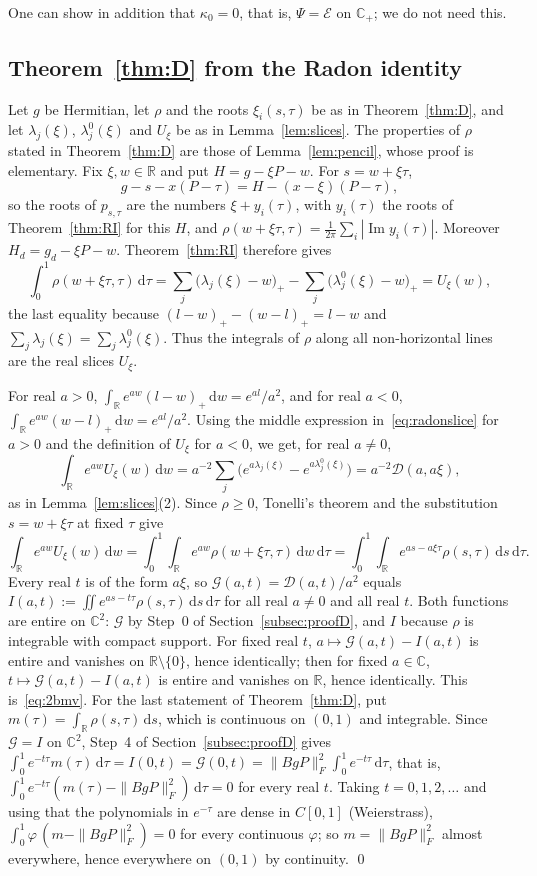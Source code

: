 \documentclass[11pt]{amsart}
\theoremstyle{definition}
\theoremstyle{remark}
\numberwithin{equation}{section}
\newcommand{\R}{\mathbb{R}}
\newcommand{\C}{\mathbb{C}}
\renewcommand{\Im}{\operatorname{Im}}
\newcommand{\cD}{\mathcal{D}}
\newcommand{\cG}{\mathcal{G}}
\newcommand{\dd}{\,\mathrm{d}}
\begin{document}
One can show in addition that $\kappa_0=0$, that is, $\Psi=\mathcal E$ on $\C_+$; we do not need this.

\subsection{Theorem~\ref{thm:D} from the Radon identity}\label{subsec:RItoD}
Let $g$ be Hermitian, let $\rho$ and the roots $\xi_i(s,\tau)$ be as in Theorem~\ref{thm:D}, and let $\lambda_j(\xi)$,
$\lambda^0_j(\xi)$ and $U_\xi$ be as in Lemma~\ref{lem:slices}. The properties of $\rho$ stated in Theorem~\ref{thm:D} are those
of Lemma~\ref{lem:pencil}, whose proof is elementary. Fix $\xi,w\in\R$ and put $H=g-\xi P-w$. For $s=w+\xi\tau$,
\[
g-s-x(P-\tau)=H-(x-\xi)(P-\tau),
\]
so the roots of $p_{s,\tau}$ are the numbers $\xi+y_i(\tau)$, with $y_i(\tau)$ the roots of Theorem~\ref{thm:RI} for this $H$,
and $\rho(w+\xi\tau,\tau)=\frac1{2\pi}\sum_i|\Im y_i(\tau)|$. Moreover $H_d=g_d-\xi P-w$. Theorem~\ref{thm:RI} therefore gives
\begin{equation}\label{eq:radonslice}
\int_0^1\rho(w+\xi\tau,\tau)\dd\tau=\sum_j\bigl(\lambda_j(\xi)-w\bigr)_+-\sum_j\bigl(\lambda^0_j(\xi)-w\bigr)_+=U_\xi(w),
\end{equation}
the last equality because $(l-w)_+-(w-l)_+=l-w$ and $\sum_j\lambda_j(\xi)=\sum_j\lambda^0_j(\xi)$. Thus the integrals of $\rho$
along all non-horizontal lines are the real slices $U_\xi$.

For real $a>0$, $\int_\R e^{aw}(l-w)_+\dd w=e^{al}/a^2$, and for real $a<0$, $\int_\R e^{aw}(w-l)_+\dd w=e^{al}/a^2$. Using the
middle expression in~\eqref{eq:radonslice} for $a>0$ and the definition of $U_\xi$ for $a<0$, we get, for real $a\ne0$,
\[
\int_\R e^{aw}U_\xi(w)\dd w=a^{-2}\sum_j\bigl(e^{a\lambda_j(\xi)}-e^{a\lambda^0_j(\xi)}\bigr)=a^{-2}\cD(a,a\xi),
\]
as in Lemma~\ref{lem:slices}(2). Since $\rho\ge0$, Tonelli's theorem and the substitution $s=w+\xi\tau$ at fixed $\tau$ give
\[
\int_\R e^{aw}U_\xi(w)\dd w=\int_0^1\!\!\int_\R e^{aw}\rho(w+\xi\tau,\tau)\dd w\dd\tau=\int_0^1\!\!\int_\R e^{as-a\xi\tau}\rho(s,\tau)\dd s\dd\tau .
\]
Every real $t$ is of the form $a\xi$, so $\cG(a,t)=\cD(a,t)/a^2$ equals $I(a,t):=\iint e^{as-t\tau}\rho(s,\tau)\dd s\dd\tau$ for
all real $a\ne0$ and all real $t$. Both functions are entire on $\C^2$: $\cG$ by Step~0 of Section~\ref{subsec:proofD}, and $I$
because $\rho$ is integrable with compact support. For fixed real $t$, $a\mapsto\cG(a,t)-I(a,t)$ is entire and vanishes on
$\R\setminus\{0\}$, hence identically; then for fixed $a\in\C$, $t\mapsto\cG(a,t)-I(a,t)$ is entire and vanishes on $\R$,
hence identically. This is~\eqref{eq:2bmv}. For the last statement of Theorem~\ref{thm:D}, put
$m(\tau)=\int_\R\rho(s,\tau)\dd s$, which is continuous on $(0,1)$ and integrable. Since $\cG=I$ on $\C^2$, Step~4 of
Section~\ref{subsec:proofD} gives $\int_0^1e^{-t\tau}m(\tau)\dd\tau=I(0,t)=\cG(0,t)=\|BgP\|_F^2\int_0^1e^{-t\tau}\dd\tau$, that is,
$\int_0^1e^{-t\tau}(m(\tau)-\|BgP\|_F^2)\dd\tau=0$ for every real $t$. Taking $t=0,1,2,\dots$ and
using that the polynomials in $e^{-\tau}$ are dense in $C[0,1]$ (Weierstrass), $\int_0^1\varphi\,(m-\|BgP\|_F^2)=0$ for every
continuous $\varphi$; so $m=\|BgP\|_F^2$ almost everywhere, hence everywhere on $(0,1)$ by continuity. \qed
\end{document}
